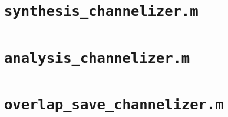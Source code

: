 \documentclass[12pt]{report}
\begin{document}
\section{\texttt{synthesis\_channelizer.m}}

\section{\texttt{analysis\_channelizer.m}}

\section{\texttt{overlap\_save\_channelizer.m}}

\end{document}

